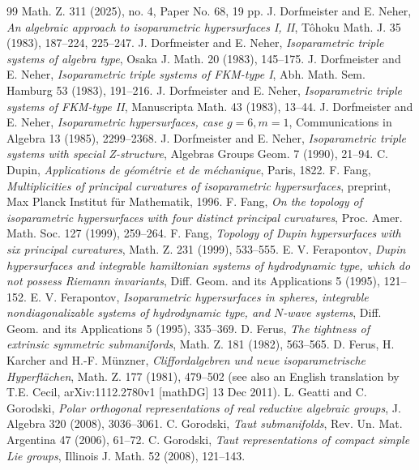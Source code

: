 \documentclass[12pt]{article}
\begin{document}
{\begin{thebibliography}{99}
Math. Z. 311 (2025), no. 4, Paper No. 68, 19 pp.
J. Dorfmeister and E. Neher, {\em An algebraic approach
to isoparametric hypersurfaces I, II}, T\^{o}hoku Math. J. 35 (1983),
187--224, 225--247.
 J. Dorfmeister and E. Neher, {\em Isoparametric triple
systems of algebra type}, Osaka J. Math. 20 (1983), 145--175.
 J. Dorfmeister and E. Neher, {\em Isoparametric
triple systems of FKM-type I}, Abh. Math. Sem. Hamburg 53 (1983), 
191--216.
 J. Dorfmeister and E. Neher, {\em Isoparametric
triple systems of FKM-type II}, Manuscripta Math. 43 (1983), 13--44.
 J. Dorfmeister and E. Neher,
{\em Isoparametric hypersurfaces,
case $g = 6, m = 1$}, Communications in Algebra 13 (1985),
2299--2368.
 J. Dorfmeister and E. Neher, {\em Isoparametric
triple systems with special Z-structure}, Algebras Groups Geom.
7 (1990), 21--94.
 C. Dupin, {\em Applications de g\'{e}om\'{e}trie
et de m\'{e}chanique}, Paris, 1822.
 F. Fang, {\em Multiplicities of principal curvatures of isoparametric hypersurfaces}, preprint, Max Planck Institut f\"{u}r Mathematik, 1996.
 F. Fang, {\em On the topology of isoparametric hypersurfaces with four distinct principal curvatures}, Proc. Amer. Math. Soc. 127 (1999), 259--264.
 F. Fang, {\em Topology of Dupin hypersurfaces with six principal curvatures}, Math. Z. 231 (1999), 533--555.
E. V. Ferapontov, {\em Dupin hypersurfaces and
integrable hamiltonian systems of hydrodynamic type, which
do not possess Riemann invariants}, Diff. Geom. and its Applications
5 (1995), 121--152.
 E. V. Ferapontov,
{\em Isoparametric hypersurfaces in spheres, integrable
nondiagonalizable systems of hydrodynamic type, and $N$-wave
systems},  Diff. Geom. and its Applications
5 (1995), 335--369.
D. Ferus, {\em The tightness of extrinsic symmetric
submanifords}, Math. Z. 181 (1982), 563--565.
 D. Ferus, H. Karcher and H.-F. M\"{u}nzner,
{\em Cliffordalgebren und neue isoparametrische
Hyperfl\"{a}chen}, Math. Z. 177 (1981), 479--502 (see also an English translation by T.E. Cecil, arXiv:1112.2780v1 [mathDG] 13 Dec 2011).
 L. Geatti and C. Gorodski, {\em Polar orthogonal representations of real reductive algebraic groups}, J. Algebra 320 (2008), 3036--3061.
 C. Gorodski, {\em Taut submanifolds}, Rev. Un. Mat. Argentina 47 (2006), 61--72.
 C. Gorodski, {\em Taut representations of compact simple Lie groups}, Illinois J. Math. 52 (2008), 121--143.

\end{thebibliography}}
\end{document}
